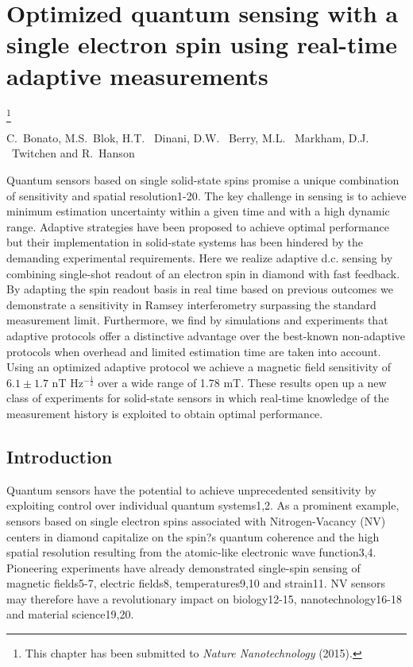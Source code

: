 

\graphicspath{{./ch_adptv_msmnt_magnetometry/figures/}}


\chapter{ Optimized quantum sensing with a single electron spin
using real-time adaptive measurements}
\label{ch:AMM}


{\renewcommand{\thefootnote}{}\footnote{This chapter has been submitted to
    {\em Nature Nanotechnology} (2015).}}

\begin{center} 
    \vspace{-1cm} {C.~Bonato, M.S.~Blok, H.T. ~Dinani, D.W. ~Berry, M.L. ~Markham, D.J. ~Twitchen  and R.~Hanson} 
\end{center}


\vspace{-0.5cm} 
Quantum sensors based on single solid-state spins promise a unique combination of sensitivity and spatial resolution1-20. The key challenge in sensing is to achieve minimum estimation uncertainty within a given time and with a high dynamic range. Adaptive strategies have been proposed to achieve optimal performance but their implementation in solid-state systems has been hindered by the demanding experimental requirements. Here we realize adaptive d.c. sensing by combining single-shot readout of an electron spin in diamond with fast feedback. By adapting the spin readout basis in real time based on previous outcomes we demonstrate a sensitivity in Ramsey interferometry surpassing the standard measurement limit. Furthermore, we find by simulations and experiments that adaptive protocols offer a distinctive advantage over the best-known non-adaptive protocols when overhead and limited estimation time are taken into account. Using an optimized adaptive protocol we achieve a magnetic field sensitivity of $6.1\pm 1.7$ nT Hz$^{-\frac{1}{2}}$ over a wide range of 1.78 mT. These results open up a new class of experiments for solid-state sensors in which real-time knowledge of the measurement history is exploited to obtain optimal performance.


\clearpage

\section{Introduction}
Quantum sensors have the potential to achieve unprecedented sensitivity by exploiting control over individual quantum systems1,2. As a prominent example, sensors based on single electron spins associated with Nitrogen-Vacancy (NV) centers in diamond capitalize on the spin?s quantum coherence and the high spatial resolution resulting from the atomic-like electronic wave function3,4. Pioneering experiments have already demonstrated single-spin sensing of magnetic fields5-7, electric fields8, temperatures9,10 and strain11. NV sensors may therefore have a revolutionary impact on biology12-15, nanotechnology16-18 and material science19,20. 

